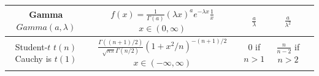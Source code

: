 \documentclass[12pt,]{krantz}
\begin{document}
\begin{center}
\begin{tabular}{ccccc}
\hline
\shortstack{Gamma \\ $Gamma(a, \lambda)$} & \shortstack{$f(x) = \frac{1}{\Gamma(a)}(\lambda x)^ae^{-\lambda x}\frac{1}{x}$\\$ x \in (0, \infty)$} & $\frac{a}{\lambda}$  & $\frac{a}{\lambda^2}$ \\
\hline
\shortstack{Student-$t$ \\ $t(n)$ \\ Cauchy is $t(1)$} & \shortstack{$\frac{\Gamma((n+1)/2)}{\sqrt{n\pi} \Gamma(n/2)} (1+x^2/n)^{-(n+1)/2}$\\$x \in (-\infty, \infty)$} & $0$ if $n>1$ & $\frac{n}{n-2}$ if $n>2$ \\
\hline
\end{tabular}
\end{center}



\backmatter
\printindex
\end{document}
